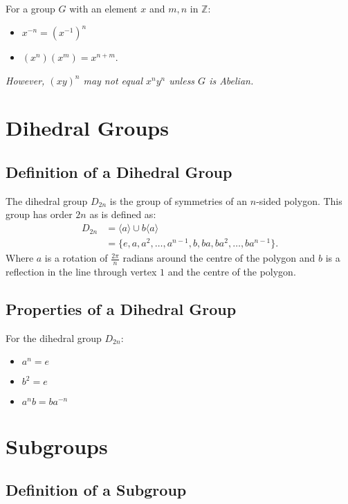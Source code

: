 \documentclass[a4paper, 12pt, twoside]{article}
\begin{document}
For a group $G$ with an element $x$ and $m, n$ in $\mathbb{Z}$:

\begin{itemize}
      \item $x^{-n} = (x^{-1})^n$
      \item $(x^n)(x^m) = x^{n + m}$.
\end{itemize}

\textit{However, $(xy)^n$ may not equal $x^ny^n$ unless $G$ is Abelian.}

\section{Dihedral Groups}

\subsection{Definition of a Dihedral Group}

The dihedral group $D_{2n}$ is the group of symmetries of an $n$-sided polygon.
This group has order $2n$ as is defined as:
\begin{align*}
      D_{2n} & = \langle a \rangle \cup b\langle a \rangle                        \\
             & = \{e, a, a^2, \ldots, a^{n - 1}, b, ba, ba^2, \ldots, ba^{n - 1}\}.
\end{align*}
Where $a$ is a rotation of $\frac{2\pi}{n}$ radians around the centre of the
polygon and $b$ is a reflection in the line through vertex $1$ and the centre
of the polygon.

\subsection{Properties of a Dihedral Group}

For the dihedral group $D_{2n}$:

\begin{itemize}
      \item $a^n = e$
      \item $b^2 = e$
      \item $a^nb = ba^{-n}$
\end{itemize}

\section{Subgroups}

\subsection{Definition of a Subgroup}
\end{document}
